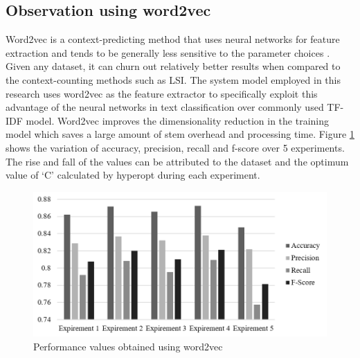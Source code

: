 \documentclass[fleqn --11pt --twoside]{IOEGC2016} %
\begin{document}
\subsection{Observation using word2vec}
Word2vec is a context-predicting method that uses neural networks for feature extraction and tends to be generally less sensitive to the parameter choices \cite{baroni2014don}. Given any dataset, it can churn out relatively better results when compared to the context-counting methods such as LSI. The system model employed in this research uses word2vec as the feature extractor to specifically exploit this advantage of the neural networks in text classification over commonly used TF-IDF model. Word2vec improves the dimensionality reduction in the training model which saves a large amount of stem overhead and processing time. Figure \ref{fig:performance_word2vec} shows the variation of accuracy, precision, recall and f-score over 5 experiments. The rise and fall of the values can be attributed to the dataset and the optimum value of `C' calculated by hyperopt during each experiment.
\begin{figure}[!ht]
\centering
\includegraphics[width=\linewidth]{assets/performance_word2vec}
\caption{Performance values obtained using word2vec}
\label{fig:performance_word2vec}
\end{figure}
% 
\end{document}

